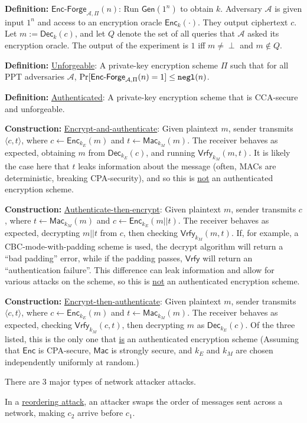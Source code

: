 \documentclass[12pt]{article}
\newcommand{\AAA}{\mathcal{A}}
\newcommand{\defn}[1]{{\bf Definition:} \underline{#1}}
\newcommand{\con}[1]{{\bf Construction:} \underline{#1}}
\newcommand{\Enc}{\mathsf{Enc}}
\newcommand{\Dec}{\mathsf{Dec}}
\newcommand{\Mac}{\mathsf{Mac}}
\newcommand{\Vrfy}{\mathsf{Vrfy}}
\newcommand{\Gen}{\mathsf{Gen}}
\newcommand{\ang}[1]{\langle#1\rangle}
\newcommand{\ExptEncfArgs}[2]{\mathsf{Enc\text{-}Forge}_{#1,#2}}
\newcommand{\ExptEncf}{\ExptEncfArgs{\AAA}{\Pi}}
\newcommand{\negl}{{\tt negl}}
\newcommand{\from}{\leftarrow}
\begin{document}
\begin{multicols}{2}

\defn{$\ExptEncf(n)$}: Run $\Gen(1^n)$ to obtain $k$. Adversary $\AAA$ is given input $1^n$ and access to an encryption oracle $\Enc_k(\cdot)$. They output ciphertext $c$. Let $m:=\Dec_k(c)$, and let $Q$ denote the set of all queries that $\AAA$ asked its encryption oracle. The output of the experiment is $1$ iff $m\neq\perp$ and $m\not\in Q$.

\defn{Unforgeable}: A private-key encryption scheme $\Pi$ such that for all PPT adversaries $\AAA$, $\Pr[\ExptEncf(n)=1]\leq\negl(n)$.

\defn{Authenticated}: A private-key encryption scheme that is CCA-secure and unforgeable.

\con{Encrypt-and-authenticate}: Given plaintext $m$, sender transmits $\ang{c,t}$, where $c\from\Enc_{k_E}(m)$ and $t\from\Mac_{k_M}(m)$. The receiver behaves as expected, obtaining $m$ from $\Dec_{k_E}(c)$, and running $\Vrfy_{k_M}(m,t)$. It is likely the case here that $t$ leaks information about the message (often, MACs are deterministic, breaking CPA-security), and so this is \underline{not} an authenticated encryption scheme.

\con{Authenticate-then-encrypt}: Given plaintext $m$, sender transmits $c$, where $t\from\Mac_{k_M}(m)$ and $c\from\Enc_{k_E}(m||t)$. The receiver behaves as expected, decrypting $m||t$ from $c$, then checking $\Vrfy_{k_M}(m,t)$. If, for example, a CBC-mode-with-padding scheme is used, the decrypt algorithm will return a ``bad padding'' error, while if the padding passes, $\Vrfy$ will return an ``authentication failure''. This difference can leak information and allow for various attacks on the scheme, so this is \underline{not} an authenticated encryption scheme.

\con{Encrypt-then-authenticate}: Given plaintext $m$, sender transmits $\ang{c,t}$, where $c\from\Enc_{k_E}(m)$ and $t\from\Mac_{k_M}(m)$. The receiver behaves as expected, checking $\Vrfy_{k_M}(c,t)$, then decrypting $m$ as $\Dec_{k_E}(c)$. Of the three listed, this is the only one that \underline{is} an authenticated encryption scheme (Assuming that $\Enc$ is CPA-secure, $\Mac$ is strongly secure, and $k_E$ and $k_M$ are chosen independently uniformly at random.)

There are 3 major types of network attacker attacks.

In a \underline{reordering attack}, an attacker swaps the order of messages sent across a network, making $c_2$ arrive before $c_1$.


\end{multicols}
\end{document}
